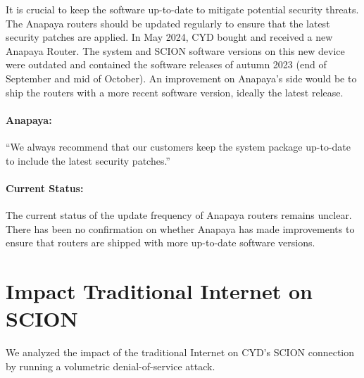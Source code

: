 It is crucial to keep the software up-to-date to mitigate potential security threats.
The Anapaya routers should be updated regularly to ensure that the latest security patches are applied.
In May 2024, CYD bought and received a new Anapaya Router.
The system and SCION software versions on this new device were outdated and contained the software releases of autumn 2023 (end of September and mid of October).
An improvement on Anapaya's side would be to ship the routers with a more recent software version, ideally the latest release.

\begin{boxH}
\paragraph{Anapaya:}
``We always recommend that our customers keep the system package up-to-date to include the latest security patches.''
\end{boxH}

\paragraph{Current Status:}
The current status of the update frequency of Anapaya routers remains unclear.
There has been no confirmation on whether Anapaya has made improvements to ensure that routers are shipped with more up-to-date software versions.


\section{Impact Traditional Internet on SCION}
\label{sec:impact-traditional-internet}
We analyzed the impact of the traditional Internet on CYD's SCION connection by running a volumetric denial-of-service attack.


